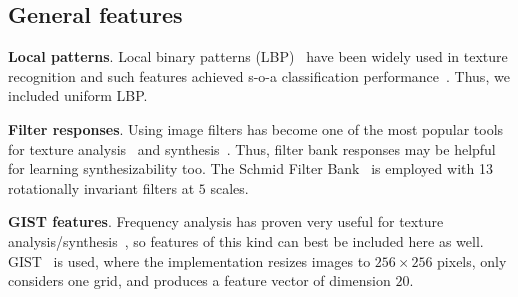 \documentclass[10pt,twocolumn,letterpaper]{article}
\begin{document}

\subsection{General features}



\textbf{Local patterns}. Local binary patterns (LBP)~\cite{lbp:2002}
have been widely used in texture recognition and such features 
achieved s-o-a classification performance~\cite{sorted:texture}. Thus, 
we included uniform LBP.

\textbf{Filter responses}. Using image filters has become one of the
most popular tools for texture analysis~\cite{texton:2001, Manjunath96}
and synthesis~\cite{zhu:frame}. Thus, filter bank responses may 
be helpful for learning synthesizability too. The Schmid Filter
Bank~\cite{Schmid01} is employed with 13 rotationally invariant
filters at $5$ scales. 

\textbf{GIST features}. Frequency analysis has proven very useful for
texture analysis/synthesis~\cite{vangool83, Manjunath96, Debonet:97}, so features 
of this kind can best be included here as well. GIST~\cite{gist} is used, 
where the implementation resizes images to $256 \times 256$ pixels, only
considers one grid, and produces a feature vector of dimension $20$.



\end{document}
